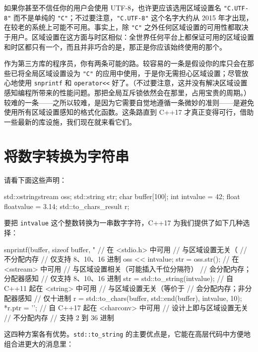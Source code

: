 如果你甚至不信任你的用户会使用 UTF-8，也许更应该选用区域设置名 \texttt{"C.\allowbreak{}UTF-8"} 而不是单纯的 \texttt{"C"}；不过要注意，\texttt{"C.\allowbreak{}UTF-8"} 这个名字大约从 2015 年才出现，在较老的系统上可能不可用。事实上，除 \texttt{"C"} 之外任何区域设置的可用性都取决于用户。区域设置在这方面与时区相似：全世界任何平台上都保证可用的区域设置和时区都只有一个，而且并非巧合的是，那正是你应该始终使用的那个。

作为第三方库的程序员，你有两条可能的路。较容易的一条是假设你的库只会在那些已将全局区域设置设为 \texttt{"C"} 的应用中使用，于是你无需担心区域设置；尽管放心地使用 \texttt{snprintf} 和 \texttt{operator<<} 好了。（不过要注意，这并没有解决区域设置感知编程所带来的性能问题。那把全局互斥锁依然会在那里，占用宝贵的周期。）较难的一条——之所以较难，是因为它需要自觉地遵循一条微妙的准则——是避免使用所有区域设置感知的格式化函数。这条路直到 C++17 才真正变得可行，借助一些最新的库设施，我们现在就来看它们。

\section{将数字转换为字符串}

请看下面这些声明：

\begin{codebox}[cpp]
    std::ostringstream oss;
    std::string str;
    char buffer[100];
    int intvalue = 42;
    float floatvalue = 3.14;
    std::to_chars_result r;
\end{codebox}

要把 \texttt{intvalue} 这个整数转换为一串数字字符，C++17 为我们提供了如下几种选择：

\begin{codebox}[cpp]
    snprintf(buffer, sizeof buffer, "%
      // 在 <stdio.h> 中可用
      // 与区域设置无关（%
      // 不分配内存
      // 仅支持 8、10、16 进制
    oss << intvalue;
    str = oss.str();
      // 在 <sstream> 中可用
      // 与区域设置相关（可能插入千位分隔符）
      // 会分配内存；分配器感知
      // 仅支持 8、10、16 进制
    str = std::to_string(intvalue);
      // 自 C++11 起在 <string> 中可用
      // 与区域设置无关（等价于 %
      // 会分配内存；非分配器感知
      // 仅十进制
    r = std::to_chars(buffer, std::end(buffer), intvalue, 10);
    *r.ptr = '\0';
      // 自 C++17 起在 <charconv> 中可用
      // 设计上即与区域设置无关
      // 不分配内存
      // 支持 2 到 36 进制
\end{codebox}

这四种方案各有优势。\texttt{std::\allowbreak{}to\_\allowbreak{}string} 的主要优点是，它能在高层代码中方便地组合进更大的消息里：

